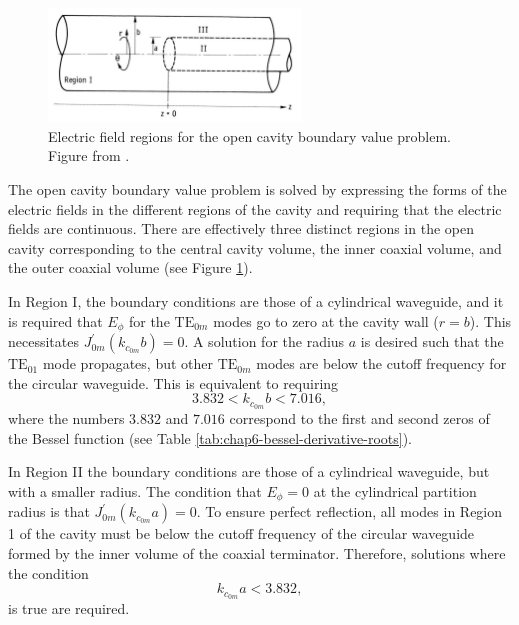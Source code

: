 \begin{figure}[htbp]
    \centering
    \includegraphics*[width=0.6\textwidth]{figs/Chapter-6/230612_open_cavity_regions.png}
    \caption{\label{fig:chap6-open-cavity-regions} Electric field regions for the open cavity boundary value problem. Figure from \cite{nasa_cavity_theory}.}
\end{figure}

The open cavity boundary value problem is solved by expressing the forms of the electric fields in the different regions of the cavity and requiring that the electric fields are continuous. There are effectively three distinct regions in the open cavity corresponding to the central cavity volume, the inner coaxial volume, and the outer coaxial volume (see Figure \ref{fig:chap6-open-cavity-regions}). 

In Region I, the boundary conditions are those of a cylindrical waveguide, and it is required that $E_\phi$ for the $\mathrm{TE}_{0m}$ modes go to zero at the cavity wall ($r=b$). This necessitates $J^\prime_{0m}(k_{c_{0m}}b)=0$. A solution for the radius $a$ is desired such that the $\mathrm{TE}_{01}$ mode propagates, but other $\mathrm{TE}_{0m}$ modes are below the cutoff frequency for the circular waveguide. This is equivalent to requiring 
\begin{equation}
    3.832<k_{c_{0m}}b<7.016,
\end{equation}
where the numbers $3.832$ and $7.016$ correspond to the first and second zeros of the Bessel function (see Table \ref{tab:chap6-bessel-derivative-roots}).

In Region II the boundary conditions are those of a cylindrical waveguide, but with a smaller radius. The condition that $E_\phi=0$ at the cylindrical partition radius is that $J^\prime_{0m}(k_{c_{0m}}a)=0$. To ensure perfect reflection, all modes in Region 1 of the cavity must be below the cutoff frequency of the circular waveguide formed by the inner volume of the coaxial terminator. Therefore, solutions where the condition
\begin{equation}
    k_{c_{0m}}a<3.832,
\end{equation}
is true are required.

